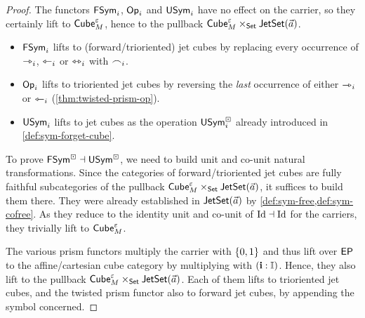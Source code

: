 \documentclass[a4paper]{memoir}
\begin{document}
\begin{proof}
	The functors $\mathsf{FSym}_i$, ${\mathsf{Op}}_i$ and $\mathsf{USym}_i$ have no effect on the carrier, so they certainly lift to ${\mathsf{Cube}}_M^\varepsilon$, hence to the pullback ${\mathsf{Cube}}_M^\varepsilon \times_{\mathsf{Set}} \mathsf{JetSet}(\vec a)$.
	\begin{itemize}
		\item $\mathsf{FSym}_i$ lifts to (forward/trioriented) jet cubes by replacing every occurrence of $\rightarrowtriangle_i$, $\leftarrowtriangle_i$ or $\leftrightarrowtriangle_i$ with $\frown_i$.
		\item ${\mathsf{Op}}_i$ lifts to trioriented jet cubes by reversing the \emph{last} occurrence of either $\rightarrowtriangle_i$ or $\leftarrowtriangle_i$ (\cref{thm:twisted-prism-op}).
		\item $\mathsf{USym}_i$ lifts to jet cubes as the operation $\mathsf{USym}^\boxdot_i$ already introduced in \cref{def:sym-forget-cube}.
	\end{itemize}
	To prove $\mathsf{FSym}^\boxdot \dashv \mathsf{USym}^\boxdot$, we need to build unit and co-unit natural transformations.
	Since the categories of forward/trioriented jet cubes are fully faithful subcategories of the pullback ${\mathsf{Cube}}_M^\varepsilon \times_{\mathsf{Set}} \mathsf{JetSet}(\vec a)$, it suffices to build them there.
	They were already established in $\mathsf{JetSet}(\vec a)$ by \cref{def:sym-free,def:sym-cofree}.
	As they reduce to the identity unit and co-unit of $\mathrm{Id} \dashv \mathrm{Id}$ for the carriers, they trivially lift to ${\mathsf{Cube}}_M^\varepsilon$.
	
	The various prism functors multiply the carrier with $\mathopen{}\left\{ 0, 1 \right\}\mathclose{}$ and thus lift over $\mathsf{EP}$ to the affine/cartesian cube category by multiplying with $(\mathbf{i} : {\mathbb I})$.
	Hence, they also lift to the pullback ${\mathsf{Cube}}_M^\varepsilon \times_{\mathsf{Set}} \mathsf{JetSet}(\vec a)$.
	Each of them lifts to trioriented jet cubes, and the twisted prism functor also to forward jet cubes, by appending the symbol concerned.
\end{proof}
\end{document}

